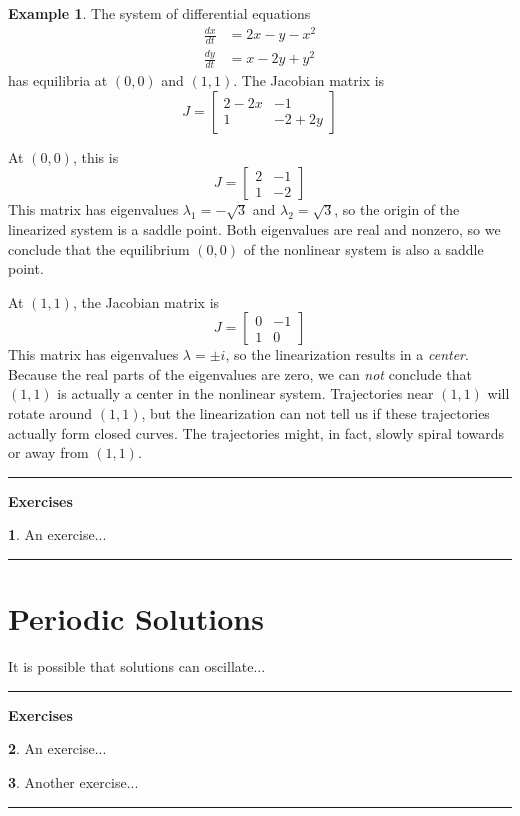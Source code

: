 \documentclass[reqno]{immbook}
\numberwithin{equation}{chapter}
\numberwithin{question}{section}
\numberwithin{theorem}{chapter}
\numberwithin{figure}{chapter}
\theoremstyle{definition}
\newtheorem{exercise}{}[section]
\newtheorem{example}{Example}[section]
\newenvironment{exercises}%
{%
\medskip\hrule\medskip\noindent\textbf{Exercises}%
}%
{%
\medskip\hrule
}
\begin{document}
%
%
\begin{example}
The system of differential equations
\begin{equation}
\begin{split}
  \frac{dx}{dt} & = 2x - y -x^2 \\
  \frac{dy}{dt} & = x - 2y + y^2
\end{split}
\end{equation}
has equilibria at $(0,0)$ and $(1,1)$.
The Jacobian matrix is
\begin{equation}
  J = \begin{bmatrix}
           2-2x & -1 \\
	   1 & -2 + 2y
      \end{bmatrix}
\end{equation}

At $(0,0)$, this is
\begin{equation}
  J = \begin{bmatrix}
           2 & -1 \\
	   1 & -2
      \end{bmatrix}
\end{equation}
This matrix has eigenvalues $\lambda_1 = -\sqrt{3}$ 
and $\lambda_2 = \sqrt{3}$, so the
origin of the  linearized system is a saddle point.
Both eigenvalues are real and nonzero,
so we conclude that the equilibrium
$(0,0)$ of the nonlinear system is also a saddle point.

At $(1,1)$, the Jacobian matrix is
\begin{equation}
  J = \begin{bmatrix}
           0 & -1 \\
	   1 & 0
      \end{bmatrix}
\end{equation}
This matrix has eigenvalues $\lambda=\pm i$,
so the linearization results in a \emph{center}.
Because the real parts of the eigenvalues are
zero, we can \emph{not} conclude that $(1,1)$
is actually a center in the nonlinear system.
Trajectories near $(1,1)$ will rotate around $(1,1)$, but
the linearization can not tell us if these trajectories
actually form closed curves.
The trajectories might, in fact, slowly spiral
towards or away from $(1,1)$.
\end{example}
%
\begin{exercises}
\begin{exercise}
An exercise...
\end{exercise}
\end{exercises}
%
\section{Periodic Solutions}
It is possible that solutions can oscillate...
\begin{exercises}
\begin{exercise}
An exercise...
\end{exercise}
\begin{exercise}
Another exercise...
\end{exercise}
\end{exercises}
\end{document}
